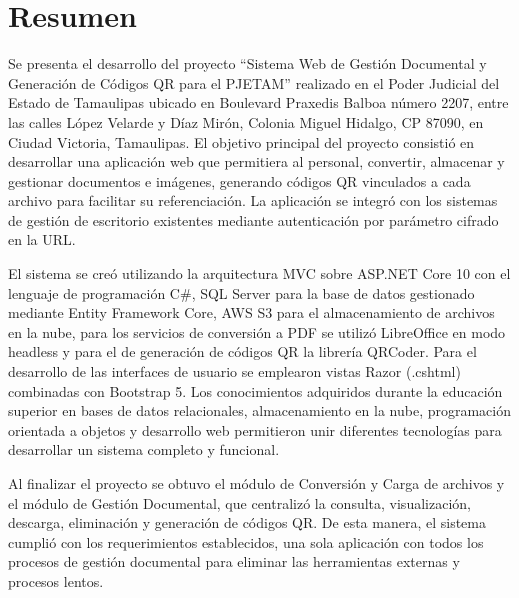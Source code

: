 \section{Resumen}
Se presenta el desarrollo del proyecto ``Sistema Web de Gestión Documental y Generación de Códigos QR para el PJETAM'' realizado en el Poder Judicial del Estado de Tamaulipas ubicado en Boulevard Praxedis Balboa número 2207, entre las calles López Velarde y Díaz Mirón, Colonia Miguel Hidalgo, CP 87090, en Ciudad Victoria, Tamaulipas.
El objetivo principal del proyecto consistió en desarrollar una aplicación web que permitiera al personal, convertir, almacenar y gestionar documentos e imágenes, generando códigos QR vinculados a cada archivo para facilitar su referenciación. La aplicación se integró con los sistemas de gestión de escritorio existentes mediante autenticación por parámetro cifrado en la URL.

El sistema se creó utilizando la arquitectura MVC sobre ASP.NET Core 10 con el lenguaje de programación C\#, SQL Server para la base de datos gestionado mediante Entity Framework Core, AWS S3 para el almacenamiento de archivos en la nube, para los servicios de conversión a PDF se utilizó LibreOffice en modo headless y para el de generación de códigos QR la librería QRCoder. Para el desarrollo de las interfaces de usuario se emplearon vistas Razor (.cshtml) combinadas con Bootstrap 5. 
Los conocimientos adquiridos durante la educación superior en bases de datos relacionales, almacenamiento en la nube, programación orientada a objetos y desarrollo web permitieron unir diferentes tecnologías para desarrollar un sistema completo y funcional. 

Al finalizar el proyecto se obtuvo el módulo de Conversión y Carga de archivos y el módulo de Gestión Documental, que centralizó la consulta, visualización, descarga, eliminación y generación de códigos QR. De esta manera, el sistema cumplió con los requerimientos establecidos, una sola aplicación con todos los procesos de gestión documental para eliminar las herramientas externas y procesos lentos.




